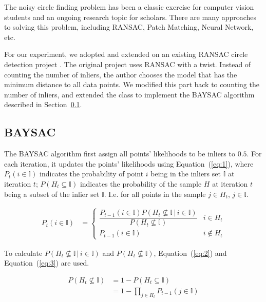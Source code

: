 \documentclass[10pt,twocolumn,letterpaper]{article}
\newcommand{\given}{\,|\,}
\newcommand{\I}{\mathbb{I}}
\begin{document}
The noisy circle finding problem has been a classic exercise for computer vision students and an ongoing research topic for scholars. There are many approaches to solving this problem, including RANSAC, Patch Matching, Neural Network, etc.

For our experiment, we adopted and extended on an existing RANSAC circle detection project \cite{RansacGitHub}. The original project uses RANSAC with a twist. Instead of counting the number of inliers, the author chooses the model that has the minimum distance to all data points. We modified this part back to counting the number of inliers, and extended the class to implement the BAYSAC algorithm described in Section~\ref{section:baysac}.


\subsection{BAYSAC}
\label{section:baysac}

The BAYSAC algorithm \cite{BaysacPaper} first assign all points' likelihoods to be inliers to $0.5$.
For each iteration, it updates the points' likelihoods using Equation~(\ref{eq:1}), where $P_{t}(i \in \I)$ indicates the probability of point $i$ being in the inliers set $\I$ at iteration $t$;
$P(H_{t} \subseteq \I)$ indicates the probability of the sample $H$ at iteration $t$ being a subset of the inlier set $\I$. I.e. for all points in the sample $j \in H_{t}$, $j \in \I$.

\begin{align} \label{eq:1}
   P_{t}(i \in \I)
    & =
   \begin{cases}
      \dfrac{P_{t - 1}(i \in \I) P(H_{t} \not\subseteq \I \given i \in \I)}{P(H_{t} \not\subseteq \I)}
       & i \in H_{t}
      \\
      P_{t - 1}(i \in \I)
       & i \not \in H_{t}
   \end{cases}
\end{align}

To calculate $P(H_{t} \not\subseteq \I \given i \in \I)$ and $P(H_{t} \not\subseteq \I)$, Equation~(\ref{eq:2}) and Equation~(\ref{eq:3}) are used.

\begin{align} \label{eq:2}
   P(H_{t} \not\subseteq \I)
    & = 1 - P(H_{t} \subseteq \I) \nonumber
   \\
    & = 1 - \prod^{}_{j \in H_{t}} P_{t - 1}(j \in \I)
\end{align}
\end{document}

